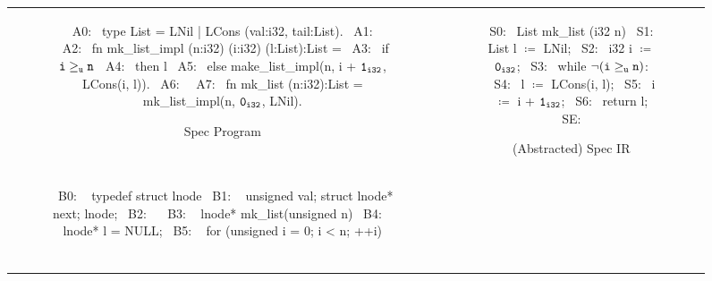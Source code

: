 \begin{figure}[t]
\begin{tabular}{cc}
\begin{subfigure}[b]{.59\textwidth}
\begin{center}
\begin{allLangEnvScript}
~{\tiny \textcolor{mygray}{A0:}}~ type List = LNil | LCons (val:i32, tail:List).
~{\tiny \textcolor{mygray}{A1:}}~
~{\tiny \textcolor{mygray}{A2:}}~ fn mk_list_impl (n:i32) (i:i32) (l:List):List =
~{\tiny \textcolor{mygray}{A3:}}~    if ${\tt i \geq_u n}$
~{\tiny \textcolor{mygray}{A4:}}~       then l
~{\tiny \textcolor{mygray}{A5:}}~       else make_list_impl(n, i + ${\tt 1_{i32}}$, LCons(i, l)).
~{\tiny \textcolor{mygray}{A6:}}~
~{\tiny \textcolor{mygray}{A7:}}~ fn mk_list (n:i32):List = mk_list_impl(n, ${\tt 0_{i32}}$, LNil).
\end{allLangEnvScript}
\end{center}
\caption{\label{fig:llAllocSpec}Spec Program}
\end{subfigure}%
&
\begin{subfigure}[b]{0.41\textwidth}
\begin{center}
\begin{allLangEnvScript}
~{\tiny \textcolor{mygray}{S0:}}~ List mk_list (i32 n) {
~{\tiny \textcolor{mygray}{S1:}}~   List l $\coloneqq$ LNil;
~{\tiny \textcolor{mygray}{S2:}}~   i32  i $\coloneqq$ ${\tt 0_{i32}}$;
~{\tiny \textcolor{mygray}{S3:}}~   while $\mathrm{\tt \neg (i \geq_{u} n)}$:
~{\tiny \textcolor{mygray}{S4:}}~     l $\coloneqq$ LCons(i, l);
~{\tiny \textcolor{mygray}{S5:}}~     i $\coloneqq$ i + ${\tt 1_{i32}}$;
~{\tiny \textcolor{mygray}{S6:}}~   return l;
~{\tiny \textcolor{mygray}{SE:}}~ }
\end{allLangEnvScript}
\end{center}
\caption{\label{fig:llAllocSpecIR}(Abstracted) Spec IR}
\end{subfigure}%
\\
\begin{subfigure}[b]{0.59\textwidth}
\begin{center}
\begin{allLangEnvScript}
~{\tiny \textcolor{mygray}{B0: }}~ typedef struct lnode {
~{\tiny \textcolor{mygray}{B1: }}~   unsigned val; struct lnode* next; } lnode;
~{\tiny \textcolor{mygray}{B2: }}~ 
~{\tiny \textcolor{mygray}{B3: }}~ lnode* mk_list(unsigned n) {
~{\tiny \textcolor{mygray}{B4: }}~   lnode* l = NULL;
~{\tiny \textcolor{mygray}{B5: }}~   for (unsigned i = 0; i < n; ++i) {                     $\phantom{m \coloneqq \mathrm{\tt m[\&\structPointer{\tt p}{m}{\tt lnode}{val} \leftarrow i]_{i32}};}$
}}
\end{allLangEnvScript}
\end{center}
\end{subfigure}
\end{tabular}
\end{figure}
